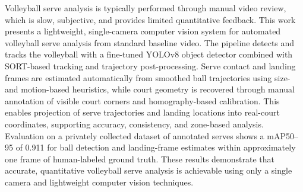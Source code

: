 Volleyball serve analysis is typically performed through manual video review, which is slow, subjective, and provides limited quantitative feedback. This work presents a lightweight, single-camera computer vision system for automated volleyball serve analysis from standard baseline video. The pipeline detects and tracks the volleyball with a fine-tuned YOLOv8 object detector combined with SORT-based tracking and trajectory post-processing. Serve contact and landing frames are estimated automatically from smoothed ball trajectories using size- and motion-based heuristics, while court geometry is recovered through manual annotation of visible court corners and homography-based calibration. This enables projection of serve trajectories and landing locations into real-court coordinates, supporting accuracy, consistency, and zone-based analysis. Evaluation on a privately collected dataset of annotated serves shows a mAP50--95 of 0.911 for ball detection and landing-frame estimates within approximately one frame of human-labeled ground truth. These results demonstrate that accurate, quantitative volleyball serve analysis is achievable using only a single camera and lightweight computer vision techniques.
